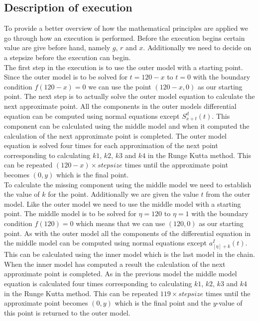 \subsection{Description of execution}
	To provide a better overview of how the mathematical principles are applied we go through how an execution is performed. Before the execution begins certain value are give before hand, namely $g$, $r$ and $x$. Additionally we need to decide on a stepsize before the execution can begin. \\
	
	The first step in the execution is to use the outer model with a starting point. Since the outer model is to be solved for $t=120-x$ to $t=0$ with the boundary condition $f(120-x)=0$ we can use the point $(120-x, 0)$ as our starting point. The next step is to actually solve the outer model equation to calculate the next approximate point. All the components in the outer models differential equation can be computed using normal equations except $S_{x+t}^d (t)$. This component can be calculated using the middle model and when it computed the calculation of the next approximate point is completed. The outer model equation is solved four times for each approximation of the next point corresponding to calculating $k1$, $k2$, $k3$ and $k4$ in the Runge Kutta method. This can be repeated $(120-x) \times stepsize$ times until the approximate point becomes $(0,y)$ which is the final point. \\
	
	To calculate the missing component using the middle model we need to establish the value of $k$ for the point. Additionally we are given the value $t$ from the outer model. Like the outer model we need to use the middle model with a starting point. The middle model is to be solved for $\eta = 120$ to $\eta = 1$ with the boundary condition $f(120) = 0$ which means that we can use $(120,0)$ as our starting point. As with the outer model all the components of the differential equation in the middle model can be computed using normal equations except $a_{[\eta]+k}^I(t)$. This can be calculated using the inner model which is the last model in the chain. When the inner model has computed a result the calculation of the next approximate point is completed. As in the previous model the middle model equation is calculated four times corresponding to calculating $k1$, $k2$, $k3$ and $k4$ in the Runge Kutta method. This can be repeated $119 \times stepsize$ times until the approximate point becomes $(0,y)$ which is the final point and the $y$-value of this point is returned to the outer model. \\
	
